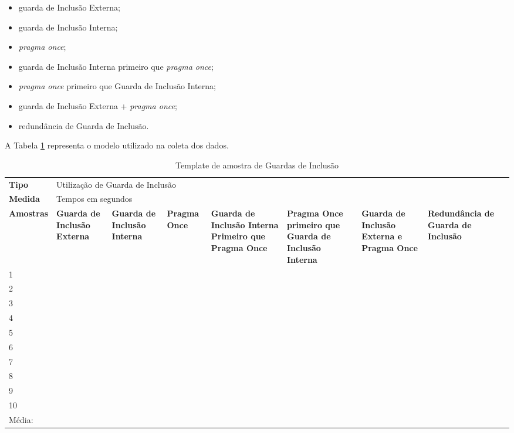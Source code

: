 \begin{itemize}
	\item guarda de Inclusão Externa;
	\item guarda de Inclusão Interna;
	\item \textit{pragma once};
	\item guarda de Inclusão Interna primeiro que \textit{pragma once};
	\item \textit{pragma once} primeiro que  Guarda de Inclusão Interna;
	\item guarda de Inclusão Externa + \textit{pragma once};
	\item redundância de Guarda de Inclusão.
\end{itemize}


A Tabela \ref{tab:modelo_guards} representa o modelo utilizado na coleta dos dados.

\begin{table}[!ht]
\centering
\caption{Template de amostra de Guardas de Inclusão}
\label{tab:modelo_guards}
\begin{tiny}
\begin{tabular}{lp{1.5cm}p{1.5cm}p{1.5cm}p{1.5cm}p{2cm}p{2cm}p{2cm}p{2cm}|}
\toprule
\textbf{Tipo} & \multicolumn{7}{l}{Utilização de Guarda de Inclusão} \\
\textbf{Medida} & \multicolumn{7}{l}{Tempos em segundos } \\ 
\textbf{Amostras} & \textbf{Guarda de Inclusão Externa} & \textbf{Guarda de Inclusão Interna} & \textbf{Pragma Once} & \textbf{Guarda de Inclusão Interna Primeiro que Pragma Once} & \textbf{Pragma Once primeiro que Guarda de Inclusão Interna} & \textbf{Guarda de Inclusão Externa e Pragma Once} & \textbf{Redundância de Guarda de Inclusão} \\ \midrule
 1  &  &  &   &   &   &   &  \\ \midrule
 2  &  &  &   &   &   &   &  \\ \midrule
 3  &  &  &   &   &   &   &  \\ \midrule
 4  &  &  &   &   &   &   &  \\ \midrule
 5  &  &  &   &   &   &   &  \\ \midrule
 6  &  &  &   &   &   &   &  \\ \midrule
 7  &  &  &   &   &   &   &  \\ \midrule 
 8  &  &  &   &   &   &   &  \\ \midrule
 9  &  &  &   &   &   &   &  \\ \midrule
 10 &  &  &   &   &   &   &  \\ \midrule
 Média: & & & & &   &   &    \\ \bottomrule
\end{tabular}
\end{tiny}
\end{table}

